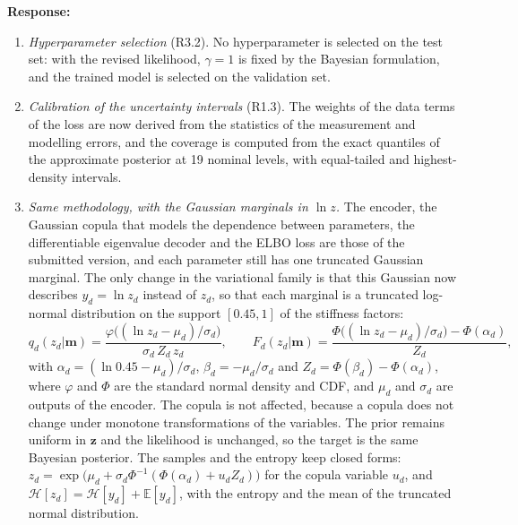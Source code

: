 \documentclass[11pt]{article}
\newenvironment{response}{\par\smallskip\noindent\color{resp}\textbf{Response:}\ }{\par}
\newcommand{\m}{\mathbf{m}}
\newcommand{\z}{\mathbf{z}}
\begin{document}
\begin{response}
\begin{enumerate}[leftmargin=*]
\item \emph{Hyperparameter selection} (R3.2). No hyperparameter is selected on the test set: with the revised
likelihood, $\gamma=1$ is fixed by the Bayesian formulation, and the trained model is selected on the validation set.
\item \emph{Calibration of the uncertainty intervals} (R1.3). The weights of the data terms of the loss are now derived
from the statistics of the measurement and modelling errors, and the coverage is computed from the exact quantiles of
the approximate posterior at 19 nominal levels, with equal-tailed and highest-density intervals.
\item \emph{Same methodology, with the Gaussian marginals in $\ln z$.} The encoder, the Gaussian copula that models the
dependence between parameters, the differentiable eigenvalue decoder and the ELBO loss are those of the submitted
version, and each parameter still has one truncated Gaussian marginal. The only change in the variational family is that
this Gaussian now describes $y_d=\ln z_d$ instead of $z_d$, so that each marginal is a truncated log-normal distribution on
the support $[0.45,1]$ of the stiffness factors:
\begin{equation}
q_d(z_d|\m)=\frac{\varphi\big((\ln z_d-\mu_d)/\sigma_d\big)}{\sigma_d\,Z_d\,z_d},\qquad
F_d(z_d|\m)=\frac{\Phi\big((\ln z_d-\mu_d)/\sigma_d\big)-\Phi(\alpha_d)}{Z_d},
\label{eq:marginal}
\end{equation}
with $\alpha_d=(\ln 0.45-\mu_d)/\sigma_d$, $\beta_d=-\mu_d/\sigma_d$ and $Z_d=\Phi(\beta_d)-\Phi(\alpha_d)$, where
$\varphi$ and $\Phi$ are the standard normal density and CDF, and $\mu_d$ and $\sigma_d$ are outputs of the encoder. The
copula is not affected, because a copula does not change under monotone transformations of the variables. The prior
remains uniform in $\z$ and the likelihood is unchanged, so the target is the same Bayesian posterior. The samples and the
entropy keep closed forms: $z_d=\exp\big(\mu_d+\sigma_d\Phi^{-1}(\Phi(\alpha_d)+u_dZ_d)\big)$ for the copula variable
$u_d$, and $\mathcal{H}[z_d]=\mathcal{H}[y_d]+\mathbb{E}[y_d]$, with the entropy and the mean of the truncated normal
distribution.


\end{enumerate}
\end{response}
\end{document}
